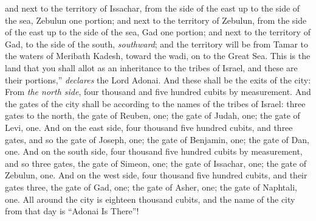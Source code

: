 \begin{biblechapter}
\verse and next to the territory of Issachar, from the side of the east up to the side of the sea, Zebulun one portion;
\verse and next to the territory of Zebulun, from the side of the east up to the side of the sea, Gad one portion;
\verse and next to the territory of Gad, to the side of the south, \textit{southward}; and the territory will be from Tamar to the waters of Meribath Kadesh, toward the wadi, on to the Great Sea.
\verse This is the land that you shall allot as an inheritance to the tribes of Israel, and these are their portions,” \textit{declares} the Lord Adonai.
\verse And these shall be the exits of the city: From \textit{the north side}, four thousand and five hundred cubits  by measurement.
\verse And the gates of the city shall be according to the names of the tribes of Israel: three gates to the north, the gate of Reuben, one; the gate of Judah, one; the gate of Levi, one.
\verse And on the east side, four thousand five hundred cubits, and three gates, and so the gate of Joseph, one; the gate of Benjamin, one; the gate of Dan, one.
\verse And on the south side, four thousand five hundred cubits by measurement, and so three gates, the gate of Simeon, one; the gate of Issachar, one; the gate of Zebulun, one.
\verse And on the west side, four thousand five hundred cubits, and their gates three, the gate of Gad, one; the gate of Asher, one; the gate of Naphtali, one.
\verse All around the city is eighteen thousand cubits, and the name of the city from that day is “Adonai Is There”!
\end{biblechapter}

